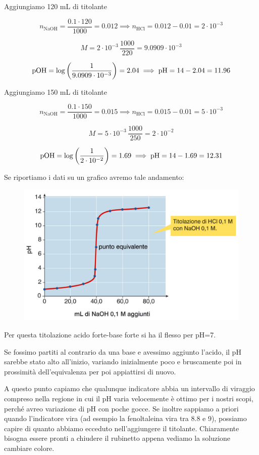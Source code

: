 Aggiungiamo 120 mL di titolante

$$n_{\text{NaOH}}=\frac{0.1 \cdot 120}{1000}= 0.012\implies n_{\text{HCl}}=0.012-0.01 = 2 \cdot 10^{-3}$$

$$M=2 \cdot 10^{-3} \, \frac{1000}{220}=9.0909 \cdot 10^{-3}$$

$$\rm pOH=\log \left( \frac{1}{9.0909 \cdot 10^{-3}} \right)=2.04 \implies \rm pH=14-2.04=11.96$$

Aggiungiamo 150 mL di titolante

$$n_{\text{NaOH}}=\frac{0.1 \cdot 150}{1000}= 0.015\implies n_{\text{HCl}}=0.015-0.01 = 5 \cdot 10^{-3}$$

$$M=5 \cdot 10^{-3} \, \frac{1000}{250}=2 \cdot 10^{-2}$$

$$\rm pOH=\log \left( \frac{1}{2 \cdot 10^{-2}} \right)=1.69 \implies \rm pH=14-1.69=12.31$$

Se riportiamo i dati su un grafico avremo tale andamento:

\begin{figure}[H]
    \hspace{1.3cm}\includegraphics[width=14cm]{immagini/titolazione_acido_forte_base_forte.png}
\end{figure}

Per questa titolazione acido forte-base forte si ha il flesso per pH=7.

Se fossimo partiti al contrario da una base e avessimo aggiunto l'acido, il pH sarebbe stato alto all'inizio, variando inizialmente poco e bruscamente poi in prossimità dell'equivalenza per poi appiattirsi di nuovo.

A questo punto capiamo che qualunque indicatore abbia un intervallo di viraggio compreso nella regione in cui il pH varia velocemente è ottimo per i nostri scopi, perché avreo variazione di pH con poche gocce. Se inoltre sappiamo a priori quando l'indicatore vira (ad esempio la fenoltaleina vira tra 8.8 e 9), possiamo capire di quanto abbiamo ecceduto nell'aggiungere il titolante. Chiaramente bisogna essere pronti a chiudere il rubinetto appena vediamo la soluzione cambiare colore.

